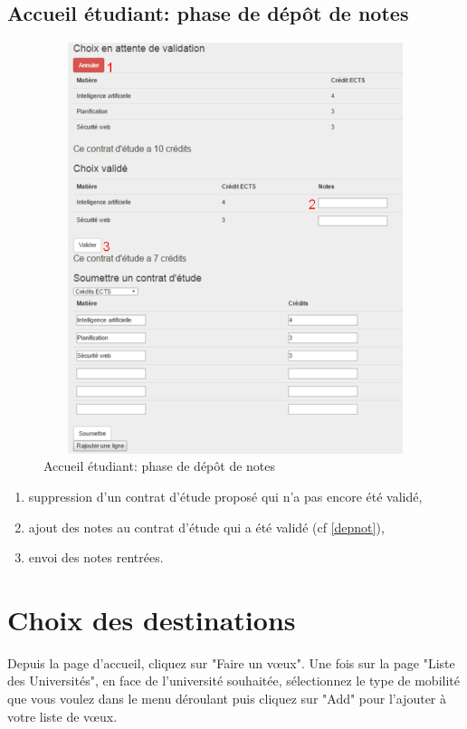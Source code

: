   \subsection{Accueil étudiant: phase de dépôt de notes}
   	\label{pn}
  \begin{figure}[H]
  	\centering
  	
  	\includegraphics[width=14cm,height=12cm]{Images/Etudiant/notes_etud.png}
  	\caption{Accueil étudiant: phase de dépôt de notes}
  \end{figure}

    \begin{enumerate}
    	\item suppression d'un contrat d'étude proposé qui n'a pas encore été validé,
    	\item ajout des notes au contrat d'étude qui a été validé (cf \ref{depnot}),
    	\item envoi des notes rentrées.
    \end{enumerate}


\section{Choix des destinations}

Depuis la page d'accueil, cliquez sur "Faire un vœux". Une fois sur la page "Liste des Universités", en face de l'université souhaitée, sélectionnez le type de mobilité que vous voulez dans le menu déroulant puis cliquez sur "Add" pour l'ajouter à votre liste de vœux.   
 
